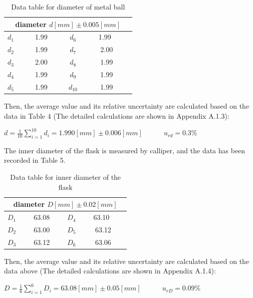 \documentclass[a4paper,12pt]{article}
\begin{document}
\begin{table}[h]
\begin{center}
\begin{tabular}{|c|c||c|c|}
\hline
\multicolumn{4}{|c|}{diameter $d [mm] \pm 0.005 [mm]$} \\
\hline
$d_1$ & ~~~~1.99~~~~ & $d_6$ & ~~~~1.99~~~~~\\
$d_2$ & 1.99 & $d_7$ & 2.00 \\
$d_3$ & 2.00 & $d_8$ & 1.99 \\
$d_4$ & 1.99 & $d_9$ & 1.99 \\
$d_5$ & 1.99 & $d_{10}$ & 1.99 \\
\hline
\end{tabular}
\caption{Data table for diameter of metal ball}
\end{center}
\end{table}

Then, the average value and its relative uncertainty are calculated based on the data in Table 4 (The detailed calculations are shown in Appendix A.1.3):
\begin{center}
$\displaystyle d = \frac{1}{10}\sum_{i=1}^{10}d_i = 1.990 [mm] \pm 0.006 [mm]$~~~~~~$\displaystyle u_{rd} = 0.3 \%$
\end{center}

\par The inner diameter of the flask is measured by calliper, and the data has been recorded in Table 5.

\begin{table}[h]
\begin{center}
\begin{tabular}{|c|c||c|c|}
\hline
\multicolumn{4}{|c|}{diameter $D [mm] \pm 0.02 [mm]$} \\
\hline
$D_1$ & ~~~63.08~~~ & $D_4$ & ~~~63.10~~~~\\
$D_2$ & 63.00 & $D_5$ & 63.12 \\
$D_3$ & 63.12 & $D_6$ & 63.06 \\
\hline
\end{tabular}
\caption{Data table for inner diameter of the flask}
\end{center}
\end{table}

Then, the average value and its relative uncertainty are calculated based on the data above (The detailed calculations are shown in Appendix A.1.4):
\begin{center}
$\displaystyle D = \frac{1}{6}\sum_{i=1}^{6}D_i = 63.08 [mm] \pm 0.05 [mm]$~~~~~~$\displaystyle u_{rD} = 0.09 \%$
\end{center}
\end{document}

